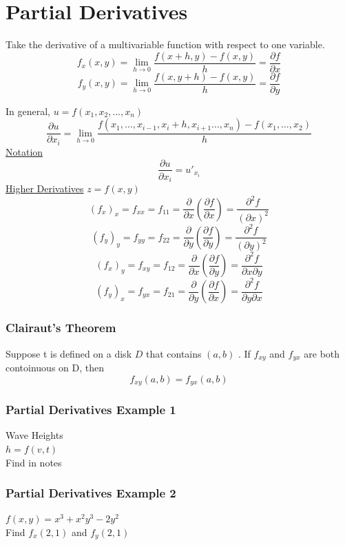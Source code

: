 \documentclass[12pt]{article}
\begin{document}
\section{Partial Derivatives}


Take the derivative of a multivariable function with respect to one variable.
\[
	f_x(x,y) = \lim_{h \to 0} \frac{f(x+h,y) - f(x,y)}{h} = \frac{\partial f}{\partial x}  
\]
\[
	f_y(x,y) = \lim_{h \to 0} \frac{f(x,y+h) - f(x,y)}{h} = \frac{\partial f}{\partial y} 
\]

In general, \(u=f(x_1,x_2,\hdots,x_n)\) 
\[
	\frac{\partial u}{\partial x_i}  = \lim_{h \to 0} \frac{f(x_1,\hdots,x_{i-1},x_i+h,x_{i+1}\hdots,x_n) - f(x_1,\hdots,x_2)}{h}
\]
\underline{Notation} \[
	\frac{\partial u}{\partial x_i} = u'_{x_i}
\]
\underline{Higher Derivatives} \(z=f(x,y)\) 
\[
	(f_x)_x = f_{x x} = f_{11} = \frac{\partial }{\partial x}(\frac{\partial f}{\partial x} ) = \frac{\partial^2f}{(\partial x)^2}  
\]
\[
	(f_y)_y = f_{y y} = f_{22} = \frac{\partial }{\partial y}(\frac{\partial f}{\partial y} ) = \frac{\partial^2f}{(\partial y)^2}  
\]
\[
	(f_x)_y = f_{x y} = f_{12} = \frac{\partial }{\partial x}(\frac{\partial f}{\partial y} ) = \frac{\partial^2f}{\partial x \partial y}  
\]
\[
	(f_y)_x = f_{y x} = f_{21} = \frac{\partial }{\partial y}(\frac{\partial f}{\partial x} ) = \frac{\partial^2f}{\partial y \partial x}  
\]

\subsubsection{Clairaut's Theorem}
Suppose t is defined on a disk \(D\) that contains \((a,b)\) . If \(f_{xy}\) and \(f_{yx}\) are both contoinuous on D, then \[
	f_{xy}(a,b) = f_{yx}(a,b)
\]
\subsubsection{Partial Derivatives Example 1}
Wave Heights\\
\(h=f(v,t)\) \\
Find in notes

\subsubsection{Partial Derivatives Example 2}
\(f(x,y) = x^3 + x^2y^3 - 2y^2\) \\
Find \(f_x(2,1)\) and \(f_y(2,1)\) 
\end{document}
